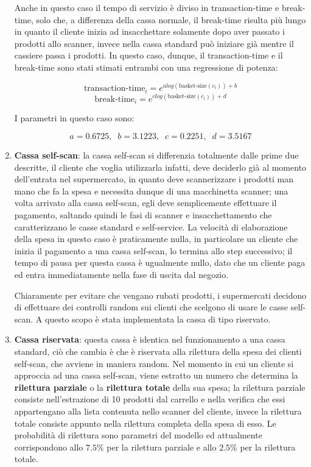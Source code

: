 \begin{enumerate}
Anche in questo caso il tempo di servizio è diviso in transaction-time e break-time, solo che, a differenza della cassa normale, il break-time risulta più lungo in quanto il cliente inizia ad insacchettare solamente dopo aver passato i prodotti allo scanner, invece nella cassa standard può iniziare già mentre il cassiere passa i prodotti. In questo caso, dunque, il transaction-time e il break-time sono stati stimati entrambi con una regressione di potenza:

\begin{equation}\label{eq:transaction-time-self-service}
\text{transaction-time}_i = e^{a log(\text{basket-size}(c_i)) + b}
\end{equation}
\begin{equation}\label{eq:break-time-self-service}
\text{break-time}_i = e^{c log(\text{basket-size}(c_i)) + d}
\end{equation}

I parametri in questo caso sono:

\begin{equation}
a = 0.6725, \;\; b = 3.1223, \;\; c = 0.2251, \;\; d = 3.5167
\end{equation}

\item \textbf{Cassa self-scan}: la cassa self-scan si differenzia totalmente dalle prime due descritte, il cliente che voglia utilizzarla infatti, deve deciderlo già al momento dell'entrata nel supermercato, in quanto deve scannerizzare i prodotti man mano che fa la spesa e necessita dunque di una macchinetta scanner; una volta arrivato alla cassa self-scan, egli deve semplicemente effettuare il pagamento, saltando quindi le fasi di scanner e insacchettamento che caratterizzano le casse standard e self-service. La velocità di elaborazione della spesa in questo caso è praticamente nulla, in particolare un cliente che inizia il pagamento a una cassa self-scan, lo termina allo step successivo; il tempo di pausa per questa cassa è ugualmente nullo, dato che un cliente paga ed entra immediatamente nella fase di uscita dal negozio.

Chiaramente per evitare che vengano rubati prodotti, i supermercati decidono di effettuare dei controlli random sui clienti che scelgono di usare le casse self-scan. A questo scopo è stata implementata la cassa di tipo riservato.
\item \textbf{Cassa riservata}: questa cassa è identica nel funzionamento a una cassa standard, ciò che cambia è che è riservata alla rilettura della spesa dei clienti self-scan, che avviene in maniera random. Nel momento in cui un cliente si approccia ad una cassa self-scan, viene estratto un numero che determina la \textbf{rilettura parziale} o la \textbf{rilettura totale} della sua spesa;
la rilettura parziale consiste nell'estrazione di 10 prodotti dal carrello e nella verifica che essi appartengano alla lista contenuta nello scanner del cliente, invece la rilettura totale consiste appunto nella rilettura completa della spesa di esso. Le probabilità di rilettura sono parametri del modello ed attualmente corrispondono allo $7.5 \%$ per la rilettura parziale e allo $2.5 \%$ per la rilettura totale.


\end{enumerate}
